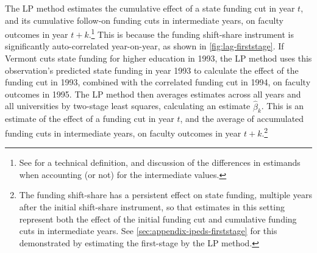The LP method estimates the cumulative effect of a state funding cut in year $t$, and its cumulative follow-on funding cuts in intermediate years, on faculty outcomes in year $t+k$.\footnote{
    See \citet[Section~8.3]{jorda2023local} for a technical definition, and discussion of the differences in estimands when accounting (or not) for the intermediate values.
}
This is because the funding shift-share instrument is significantly auto-correlated year-on-year, as shown in \autoref{fig:lag-firststage}.
If Vermont cuts state funding for higher education in 1993, the LP method uses this observation's predicted state funding in year 1993 to calculate the effect of the funding cut in 1993, combined with the correlated funding cut in 1994, on faculty outcomes in 1995.
The LP method then averages estimates across all years and all universities by two-stage least squares, calculating an estimate $\hat \beta_k$.
This is an estimate of the effect of a funding cut in year $t$, and the average of accumulated funding cuts in intermediate years, on faculty outcomes in year $t+k$.\footnote{
    The funding shift-share has a persistent effect on state funding, multiple years after the initial shift-share instrument, so that estimates in this setting represent both the effect of the initial funding cut and cumulative funding cuts in intermediate years.
    See \autoref{sec:appendix-ipeds-firststage} for this demonstrated by estimating the first-stage by the LP method.
}
